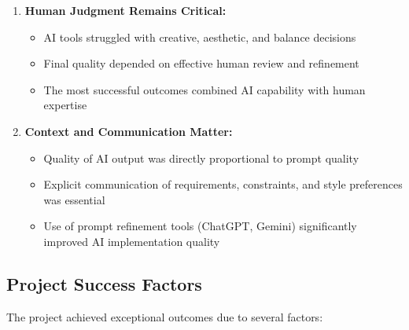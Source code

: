 \documentclass[12pt,a4paper]{article}
\begin{document}
\begin{enumerate}
    \item \textbf{Human Judgment Remains Critical:}
    \begin{itemize}
        \item AI tools struggled with creative, aesthetic, and balance decisions
        \item Final quality depended on effective human review and refinement
        \item The most successful outcomes combined AI capability with human expertise
    \end{itemize}
    
    \item \textbf{Context and Communication Matter:}
    \begin{itemize}
        \item Quality of AI output was directly proportional to prompt quality
        \item Explicit communication of requirements, constraints, and style preferences was essential
        \item Use of prompt refinement tools (ChatGPT, Gemini) significantly improved AI implementation quality
    \end{itemize}
\end{enumerate}

\subsection{Project Success Factors}

The project achieved exceptional outcomes due to several factors:
\end{document}
